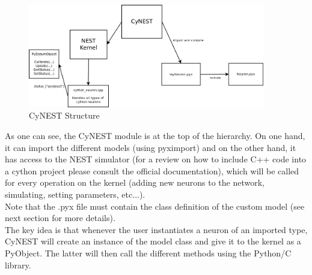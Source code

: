 \documentclass{article}
\begin{document}
\begin{figure}[h]
\begin{center}
\includegraphics[width=0.92\textwidth]{Ressources/CyNEST_Structure}
\caption{CyNEST Structure}
\end{center}
\end{figure}
As one can see, the CyNEST module is at the top of the hierarchy. On one hand, it can import the different models (using pyximport) and on the other hand, it has access to the NEST simulator (for a review on how to include C++ code into a cython project please consult the official documentation), which will be called for every operation on the kernel (adding new neurons to the network, simulating, setting parameters, etc...). \\
Note that the .pyx file must contain the class definition of the custom model (see next section for more details).\\
The key idea is that whenever the user instantiates a neuron of an imported type, CyNEST will create an instance of the model class and give it to the kernel as a PyObject. The latter will then call the different methods using the Python/C library.
\end{document}

